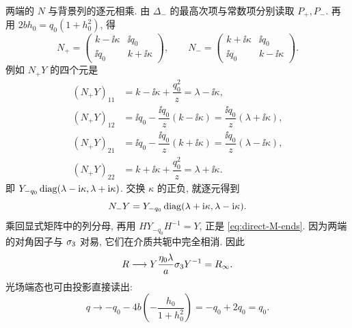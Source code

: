 \par\smallskip\noindent 两端的 $N$ 与背景列的逐元相乘.\quad
由 $\Delta_-$ 的最高次项与常数项分别读取 $P_+,P_-$.
再用 $2bh_0=q_0(1+h_0^2)$, 得
\begin{equation*}
N_+=\begin{pmatrix}k-\ii\kappa&\ii q_0\\
\ii q_0&k+\ii\kappa\end{pmatrix},\qquad
N_-=\begin{pmatrix}k+\ii\kappa&\ii q_0\\
\ii q_0&k-\ii\kappa\end{pmatrix}.
\end{equation*}
例如 $N_+Y$ 的四个元是
\begin{equation*}
\begin{aligned}
(N_+Y)_{11}&=k-\ii\kappa+\dfrac{q_0^2}{z}=\lambda-\ii\kappa,\\
(N_+Y)_{12}&=\ii q_0-\dfrac{\ii q_0}{z}(k-\ii\kappa)
=\dfrac{\ii q_0}{z}(\lambda+\ii\kappa),\\
(N_+Y)_{21}&=\ii q_0-\dfrac{\ii q_0}{z}(k+\ii\kappa)
=\dfrac{\ii q_0}{z}(\lambda-\ii\kappa),\\
(N_+Y)_{22}&=k+\ii\kappa+\dfrac{q_0^2}{z}=\lambda+\ii\kappa.
\end{aligned}
\end{equation*}
即 $Y_{-q_0}\operatorname{diag}(\lambda-\mathrm{i}\kappa,\lambda+\mathrm{i}\kappa)$.
交换 $\kappa$ 的正负, 就逐元得到
\begin{equation*}
N_-Y=Y_{-q_0}\operatorname{diag}(\lambda+\mathrm{i}\kappa,\lambda-\mathrm{i}\kappa).
\end{equation*}
乘回显式矩阵中的列分母, 再用 $HY_{-q_0}H^{-1}=Y$,
正是 \eqref{eq:direct-M-ends}.
因为两端的对角因子与 $\sigma_3$ 对易, 它们在介质共轭中完全相消.
因此
\begin{equation*}
R\longrightarrow Y\dfrac{\eta_0\lambda}{a}\sigma_3 Y^{-1}=R_\infty.
\end{equation*}
光场端态也可由投影直接读出:
\begin{equation*}
q\longrightarrow -q_0-4b\left(-\dfrac{h_0}{1+h_0^2}\right)
=-q_0+2q_0=q_0.
\end{equation*}


